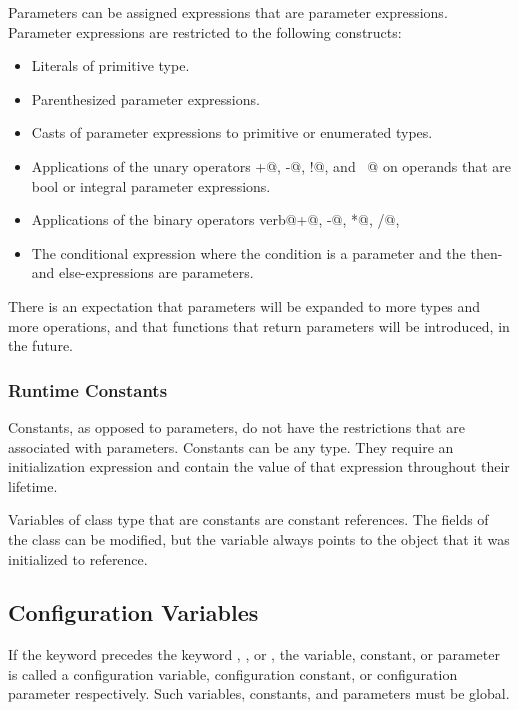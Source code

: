 Parameters can be assigned expressions that are parameter expressions.
Parameter expressions are restricted to the following constructs:
\begin{itemize}
\item
 Literals of primitive type.
\item
 Parenthesized parameter expressions.
\item
 Casts of parameter expressions to primitive or enumerated types.
\item
 Applications of the unary operators \verb@+@, \verb@-@, \verb@!@,
 and \verb@~@ on operands that are bool or integral parameter
 expressions.
\item
 Applications of the binary operators verb@+@, \verb@-@, \verb@*@, \verb@/@, \verb@%@, \verb@**@, \verb@&&@, \verb@||@, \verb@!@, \verb@&@, \verb@|@, \verb@^@, \verb@~@, \verb@<<@, \verb@>>@, \verb@==@, \verb@!=@, \verb@<=@, \verb@>=@, \verb@<@, and \verb@>@ on operands that are bool or integral parameter expressions.
\item
 The conditional expression where the condition is a parameter and the
 then- and else-expressions are parameters.
\end{itemize}

There is an expectation that parameters will be expanded to more types
and more operations, and that functions that return parameters will be
introduced, in the future.

\subsubsection{Runtime Constants}
\label{Runtime_Constants}

Constants, as opposed to parameters, do not have the restrictions that
are associated with parameters.  Constants can be any type.  They
require an initialization expression and contain the value of that
expression throughout their lifetime.

Variables of class type that are constants are constant references.
The fields of the class can be modified, but the variable always
points to the object that it was initialized to reference.

\subsection{Configuration Variables}
\label{Configuration_Variables}

If the keyword  precedes the
keyword , , or , the variable,
constant, or parameter is called a configuration variable,
configuration constant, or configuration parameter respectively.  Such
variables, constants, and parameters must be global.

